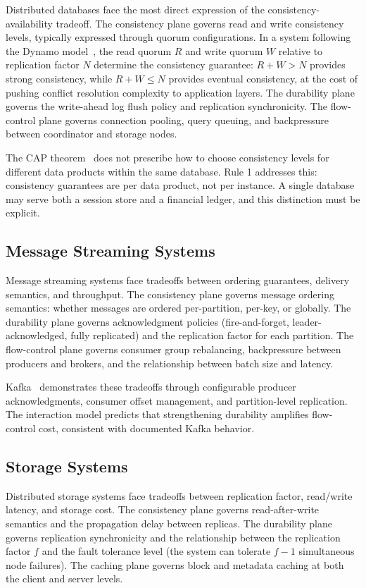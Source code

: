 \documentclass[conference]{IEEEtran}
\begin{document}
Distributed databases face the most direct expression of the consistency-availability tradeoff. The consistency plane governs read and write consistency levels, typically expressed through quorum configurations. In a system following the Dynamo model~\cite{dynamo}, the read quorum $R$ and write quorum $W$ relative to replication factor $N$ determine the consistency guarantee: $R + W > N$ provides strong consistency, while $R + W \leq N$ provides eventual consistency, at the cost of pushing conflict resolution complexity to application layers. The durability plane governs the write-ahead log flush policy and replication synchronicity. The flow-control plane governs connection pooling, query queuing, and backpressure between coordinator and storage nodes.

The CAP theorem~\cite{brewer2000cap} does not prescribe how to choose consistency levels for different data products within the same database. Rule 1 addresses this: consistency guarantees are per data product, not per instance. A single database may serve both a session store and a financial ledger, and this distinction must be explicit.

\subsection{Message Streaming Systems}

Message streaming systems face tradeoffs between ordering guarantees, delivery semantics, and throughput. The consistency plane governs message ordering semantics: whether messages are ordered per-partition, per-key, or globally. The durability plane governs acknowledgment policies (fire-and-forget, leader-acknowledged, fully replicated) and the replication factor for each partition. The flow-control plane governs consumer group rebalancing, backpressure between producers and brokers, and the relationship between batch size and latency.

Kafka~\cite{kafka} demonstrates these tradeoffs through configurable producer acknowledgments, consumer offset management, and partition-level replication. The interaction model predicts that strengthening durability amplifies flow-control cost, consistent with documented Kafka behavior.

\subsection{Storage Systems}

Distributed storage systems face tradeoffs between replication factor, read/write latency, and storage cost. The consistency plane governs read-after-write semantics and the propagation delay between replicas. The durability plane governs replication synchronicity and the relationship between the replication factor $f$ and the fault tolerance level (the system can tolerate $f-1$ simultaneous node failures). The caching plane governs block and metadata caching at both the client and server levels.
\end{document}
